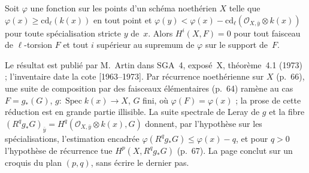 \begin{encadre}
\begin{theoreme*}\nonverifie
Soit $\varphi$ une fonction sur les points d'un schéma noethérien $X$ telle que $\varphi(x) \geq \mathrm{cd}_\ell(k(x))$ en tout point et $\varphi(y) < \varphi(x) - \mathrm{cd}_\ell(\mathcal O_{X,\bar y} \otimes k(x))$ pour toute spécialisation stricte $y$ de~$x$. Alors $H^i(X, F) = 0$ pour tout faisceau de $\ell$-torsion $F$ et tout $i$ supérieur au supremum de $\varphi$ sur le support de~$F$.
\end{theoreme*}
\end{encadre}
\begin{demopage}[pages 64 à 67]
Le résultat est publié par M.~Artin dans SGA~4, exposé~X, théorème~4.1 (1973) \cite{sga4-3} ; l'inventaire date la cote [1963--1973]. Par récurrence noethérienne sur $X$ (p.~66), une suite de composition par des faisceaux élémentaires (p.~64) ramène au cas $F = g_*(G)$, $g : \operatorname{Spec} k(x) \to X$, $G$ fini, où $\varphi(F) = \varphi(x)$ ; la prose de cette réduction est en grande partie illisible. La suite spectrale de Leray de $g$ et la fibre $(R^q g_*G)_{\bar y} = H^q(\mathcal O_{X,\bar y} \otimes k(x), G)$ donnent, par l'hypothèse sur les spécialisations, l'estimation encadrée $\varphi(R^q g_*G) \leq \varphi(x) - q$, et pour $q > 0$ l'hypothèse de récurrence tue $H^p(X, R^q g_*G)$ (p.~67). La page conclut sur un croquis du plan $(p, q)$, sans écrire le dernier pas.
\end{demopage}

